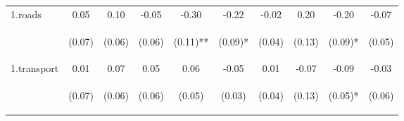 \begin{center}
\begin{tabular}{lccccccccc}
\noalign{\smallskip}1.roads & 0.05 & 0.10 & -0.05 & -0.30 & -0.22 & -0.02 & 0.20 & -0.20 & -0.07\\
 & \begin{footnotesize}(0.07)\end{footnotesize} & \begin{footnotesize}(0.06)\end{footnotesize} & \begin{footnotesize}(0.06)\end{footnotesize} & \begin{footnotesize}(0.11)**\end{footnotesize} & \begin{footnotesize}(0.09)*\end{footnotesize} & \begin{footnotesize}(0.04)\end{footnotesize} & \begin{footnotesize}(0.13)\end{footnotesize} & \begin{footnotesize}(0.09)*\end{footnotesize} & \begin{footnotesize}(0.05)\end{footnotesize}\\
\noalign{\smallskip}1.transport & 0.01 & 0.07 & 0.05 & 0.06 & -0.05 & 0.01 & -0.07 & -0.09 & -0.03\\
 & \begin{footnotesize}(0.07)\end{footnotesize} & \begin{footnotesize}(0.06)\end{footnotesize} & \begin{footnotesize}(0.06)\end{footnotesize} & \begin{footnotesize}(0.05)\end{footnotesize} & \begin{footnotesize}(0.03)\end{footnotesize} & \begin{footnotesize}(0.04)\end{footnotesize} & \begin{footnotesize}(0.13)\end{footnotesize} & \begin{footnotesize}(0.05)*\end{footnotesize} & \begin{footnotesize}(0.06)\end{footnotesize}\\

\end{tabular}
\end{center}
